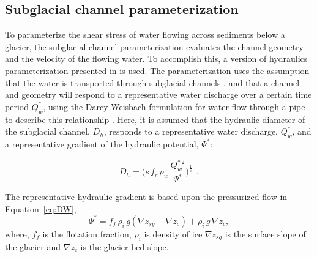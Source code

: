 \documentclass[11pt]{article}
\begin{document}
\begin{spacing}{1}
          \subsection{Subglacial channel  parameterization}
          \label{sect:sub_mode}
          To parameterize the shear stress of water flowing across sediments below a glacier, the subglacial channel parameterization evaluates the channel geometry and the velocity of the flowing water. 
          To accomplish this,  a version of hydraulics parameterization presented in \citet{delaney2019} is used.
          The parameterization uses the assumption that the water is transported through subglacial channels \citep[Figure~\ref{fig:cartoon}; ][]{rothlisberger1972}, and that a channel and geometry will respond to a representative water discharge over a certain time period $Q_{w}^*$, using the Darcy-Weisbach formulation for water-flow through a pipe to describe this relationship \citep[e.g.][]{rothlisberger1972,clarke2003,werder2013}.
          Here, it is assumed that the hydraulic diameter of the subglacial channel, $D_h$, responds to a representative water discharge, $Q_{w}^*$, and a representative gradient of the hydraulic potential, $\Psi^*$:
          \begin{linenomath*}
            \begin{equation}
              \label{eq:DW}
              D_h = \big(s\, f_r\,\rho_w\, \frac{Q_w^{*\,2}}{\Psi^*}\big)^{\frac{1}{5}}~~.
            \end{equation}
          \end{linenomath*}
          The representative hydraulic gradient is based upon the pressurized flow in Equation~\ref{eq:DW},
          \begin{equation}
            \label{eq:psi}
            \Psi^*= f_f \,  \rho_i \, g (\nabla z_{sg} - \nabla z_c) +  \rho_i \, g \, \nabla z_c,
          \end{equation}
          \noindent
          where, $f_f$ is the flotation fraction, $\rho_i$ is density of ice $\nabla z_{sg}$ is the surface slope of the glacier and $\nabla z_{c}$ is the glacier bed slope.
          

\end{spacing}
\end{document}
